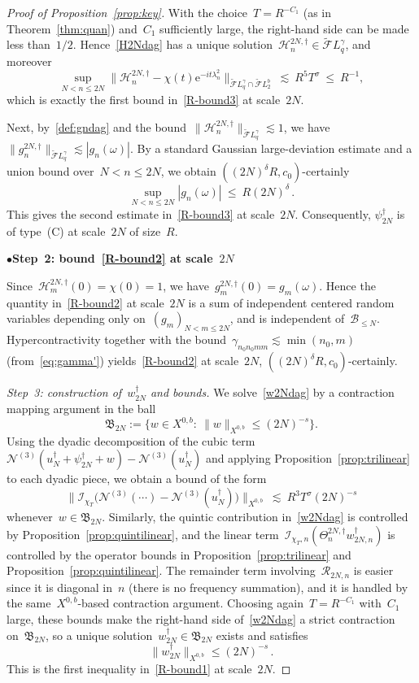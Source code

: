 \documentclass[11pt,reqno,english]{amsart}
\numberwithin{equation}{section}
\theoremstyle{plain}
\theoremstyle{definition}
\theoremstyle{remark}
\newcommand{\noi}{\noindent}
\newcommand{\e}{\mathrm{e}}
\begin{document}
\begin{proof}[Proof of Proposition~\ref{prop:key}]
	With the choice~$T=R^{-C_1}$ (as in Theorem~\ref{thm:quan}) and~$C_1$ sufficiently large,
	the right-hand side can be made less than~$1/2$. Hence~\eqref{H2Ndag} has a unique solution~$\mathcal{H}_n^{2N,\dag}\in \widetilde{\mathcal{F}}L_q^{\gamma}$, and moreover
	\[
	\sup_{N<n\le 2N}\big\|\mathcal{H}_n^{2N,\dag}-\chi(t)\e^{-it\lambda_n^2}\big\|_{\widetilde{\mathcal{F}}L_q^{\gamma}\cap \widetilde{\mathcal{F}}L_{2}^{b}}
	\ \lesssim\ R^5T^{\sigma}
	\ \le\ R^{-1},
	\]
	which is exactly the first bound in~\eqref{R-bound3} at scale~$2N$.

	Next, by~\eqref{def:gndag} and the bound~$\|\mathcal{H}_n^{2N,\dag}\|_{\widetilde{\mathcal{F}}L_q^{\gamma}}\lesssim 1$,
	we have~$\|g_n^{2N,\dag}\|_{\widetilde{\mathcal{F}}L_q^{\gamma}}\lesssim |g_n(\omega)|$. By a standard Gaussian
	large-deviation estimate and a union bound over~$N<n\le 2N$, we obtain $((2N)^{\delta}R,c_0)$-certainly
	\[
	\sup_{N<n\le 2N}|g_n(\omega)|\ \le\ R(2N)^{\delta}\,.
	\]
	This gives the second estimate in~\eqref{R-bound3}
	at scale~$2N$. Consequently, $\psi_{2N}^{\dag}$ is of type~(C) at scale~$2N$ of size~$R$.
\medskip

	\noi
	$\bullet${\bf Step~2: bound~\eqref{R-bound2} at scale~$2N$}
	
	
	Since~$\mathcal{H}_m^{2N,\dag}(0)=\chi(0)=1$, we have~$g_m^{2N,\dag}(0)=g_m(\omega)$.
	Hence the quantity in~\eqref{R-bound2} at scale~$2N$ is a sum of independent centered random variables
	depending only on~$(g_m)_{N<m\le 2N}$, and is independent of~$\mathcal{B}_{\le N}$.
	Hypercontractivity together with the bound~$\gamma_{n_0n_0mm}\lesssim \min(n_0,m)$ (from~\eqref{eq:gamma'}) yields~\eqref{R-bound2} at scale~$2N$, $((2N)^{\delta}R,c_0)$-certainly.

	\emph{Step~3: construction of~$w_{2N}^{\dag}$ and bounds.}
	We solve~\eqref{w2Ndag} by a contraction mapping argument in the ball
	\[
	\mathfrak{B}_{2N}:=\{w\in X^{0,b}:\ \|w\|_{X^{0,b}}\le (2N)^{-s}\}.
	\]
	Using the dyadic decomposition of the cubic term~$\mathcal{N}^{(3)}(u_N^{\dag}+\psi_{2N}^{\dag}+w)-\mathcal{N}^{(3)}(u_N^{\dag})$
	and applying Proposition~\ref{prop:trilinear} to each dyadic piece,
	we obtain a bound of the form
	\[
	\big\|\mathcal{I}_{\chi_T}\big(\mathcal{N}^{(3)}(\cdots)-\mathcal{N}^{(3)}(u_N^{\dag})\big)\big\|_{X^{0,b}}
	\ \lesssim\ R^3T^{\sigma}(2N)^{-s}
	\]
	whenever~$w\in\mathfrak{B}_{2N}$. Similarly, the quintic contribution in~\eqref{w2Ndag}
	is controlled by Proposition~\ref{prop:quintilinear}, and the linear term~$\mathcal{I}_{\chi_T,n}(\Theta_n^{2N,\dag}w_{2N,n}^{\dag})$ is controlled by the operator bounds
	in Proposition~\ref{prop:trilinear} and Proposition~\ref{prop:quintilinear}.
	The remainder term involving~$\mathcal{R}_{2N,n}$ is easier since it is diagonal in~$n$
	(there is no frequency summation), and it is handled by the same~$X^{0,b}$-based contraction argument.
	Choosing again~$T=R^{-C_1}$ with~$C_1$ large, these bounds make the right-hand side of~\eqref{w2Ndag}
	a strict contraction on~$\mathfrak{B}_{2N}$, so a unique solution~$w_{2N}^{\dag}\in\mathfrak{B}_{2N}$
	exists and satisfies
	\[
	\|w_{2N}^{\dag}\|_{X^{0,b}}\le (2N)^{-s}\,.
	\]
	This is the first inequality in~\eqref{R-bound1} at scale~$2N$.


\end{proof}
\end{document}
